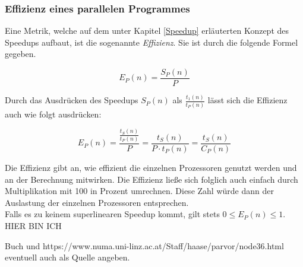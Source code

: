 			\subsubsection{Effizienz eines parallelen Programmes}
			
				Eine Metrik, welche auf dem unter Kapitel \ref{Speedup} erläuterten Konzept des Speedups aufbaut, ist die sogenannte \textit{Effizienz}. Sie ist durch die folgende Formel gegeben.
				
				\[ E_P(n) = \frac{S_P(n)}{P} \]
				
				Durch das Ausdrücken des Speedups $S_P(n)$ als \( \frac{t_1(n)}{t_P(n)} \) lässt sich die Effizienz auch wie folgt ausdrücken:
				
				\[ E_P(n) = \frac{\frac{t_S(n)}{t_P(n)}}{P} = \frac{t_S(n)}{P \cdot t_P(n)} = \frac{t_S(n)}{C_P(n)} \]
				
				Die Effizienz gibt an, wie effizient die einzelnen Prozessoren genutzt werden und an der Berechnung mitwirken. Die Effizienz ließe sich folglich auch einfach durch Multiplikation mit 100 in Prozent umrechnen. Diese Zahl würde dann der Auslastung der einzelnen Prozessoren entsprechen.\\
				Falls es zu keinem superlinearen Speedup kommt, gilt stets \( 0 \leq E_P(n) \leq 1 \).\\
				HIER BIN ICH
				
				Buch und https://www.numa.uni-linz.ac.at/Staff/haase/parvor/node36.html eventuell auch als Quelle angeben.